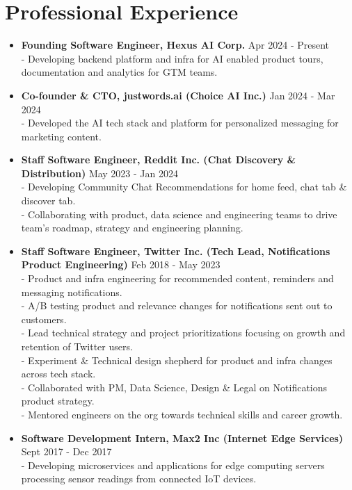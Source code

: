 \documentclass{article}
\begin{document}
\section*{Professional Experience}
\begin{itemize}
    \item \textbf{Founding Software Engineer, Hexus AI Corp.} {\hfill Apr 2024 - Present}\\
    - Developing backend platform and infra for AI enabled product tours, documentation and analytics for GTM teams.

    \item \textbf{Co-founder \& CTO, justwords.ai (Choice AI Inc.)} {\hfill Jan 2024 - Mar 2024}\\
    - Developed the AI tech stack and platform for personalized messaging for marketing content.
    
    \item \textbf{Staff Software Engineer, Reddit Inc. (Chat Discovery \& Distribution)} {\hfill May 2023 - Jan 2024}\\
    - Developing Community Chat Recommendations for home feed, chat tab \& discover tab.\\
    - Collaborating with product, data science and engineering teams to drive team's roadmap, strategy and engineering planning.
    
    \item \textbf{Staff Software Engineer, Twitter Inc. (Tech Lead, Notifications Product Engineering)} {\hfill Feb 2018 - May 2023}\\
    - Product and infra engineering for recommended content, reminders and messaging notifications.\\
    - A/B testing product and relevance changes for notifications sent out to customers.\\
    - Lead technical strategy and project prioritizations focusing on growth and retention of Twitter users.\\
    - Experiment \& Technical design shepherd for product and infra changes across tech stack.\\
    - Collaborated with PM, Data Science, Design \& Legal on Notifications product strategy.\\
    - Mentored engineers on the org towards technical skills and career growth.

    \item \textbf{Software Development Intern, Max2 Inc (Internet Edge Services)} {\hfill Sept 2017 - Dec 2017}\\
    - Developing microservices and applications for edge computing servers processing sensor readings from connected IoT devices.


\end{itemize}
\end{document}
